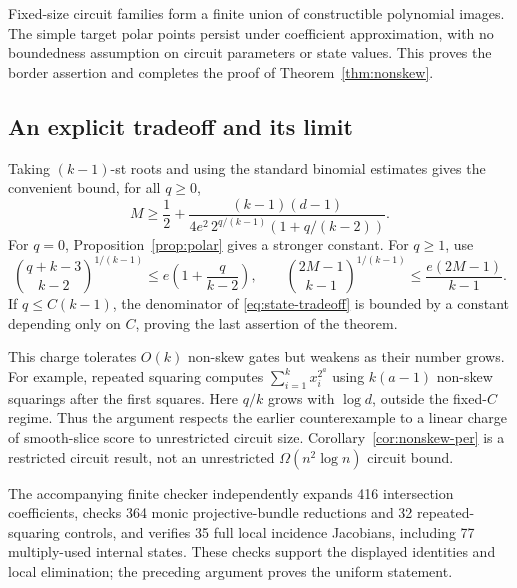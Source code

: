 Fixed-size circuit families form a finite union of constructible
polynomial images. The simple target polar points persist under
coefficient approximation, with no boundedness assumption on circuit
parameters or state values. This proves the border assertion and
completes the proof of Theorem~\ref{thm:nonskew}.

\subsection*{An explicit tradeoff and its limit}

Taking $(k-1)$-st roots and using the standard binomial estimates
gives the convenient bound, for all $q\ge0$,
\begin{equation}\label{eq:state-tradeoff}
 M\ge\frac12+
 \frac{(k-1)(d-1)}
 {4e^2\,2^{q/(k-1)}(1+q/(k-2))}.
\end{equation}
For $q=0$, Proposition~\ref{prop:polar} gives a stronger constant.
For $q\ge1$, use
\[
 \binom{q+k-3}{k-2}^{1/(k-1)}
 \le e\left(1+\frac q{k-2}\right),\qquad
 \binom{2M-1}{k-1}^{1/(k-1)}
 \le\frac{e(2M-1)}{k-1}.
\]
If $q\le C(k-1)$, the denominator of
\eqref{eq:state-tradeoff} is bounded by a constant depending only on
$C$, proving the last assertion of the theorem.

This charge tolerates $O(k)$ non-skew gates but weakens as their number
grows. For example, repeated squaring computes
$\sum_{i=1}^k x_i^{2^a}$ using $k(a-1)$ non-skew squarings after the
first squares. Here $q/k$ grows with $\log d$, outside the fixed-$C$
regime. Thus the argument respects the earlier counterexample to a
linear charge of smooth-slice score to unrestricted circuit size.
Corollary~\ref{cor:nonskew-per} is a restricted circuit result, not an
unrestricted $\Omega(n^2\log n)$ circuit bound.

The accompanying finite checker independently expands 416 intersection
coefficients, checks 364 monic projective-bundle reductions and 32
repeated-squaring controls, and verifies 35 full local incidence
Jacobians, including 77 multiply-used internal states. These checks
support the displayed identities and local elimination; the preceding
argument proves the uniform statement.
